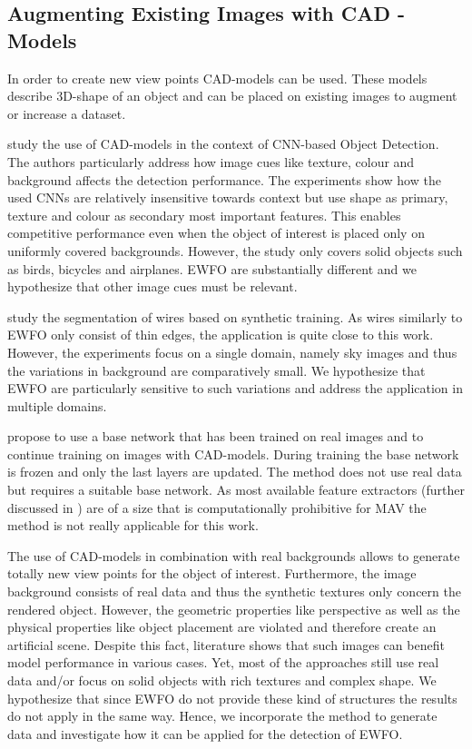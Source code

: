 \subsection{Augmenting Existing Images with CAD - Models}

In order to create new view points \ac{CAD}-models can be used. These models describe 3D-shape of an object and can be placed on existing images to augment or increase a dataset.

\citeauthor{Peng}\cite{Peng} study the use of \ac{CAD}-models in the context of \ac{CNN}-based Object Detection. The authors particularly address how image cues like texture, colour and background affects the detection performance. The experiments show how the used \acp{CNN} are relatively insensitive towards context but use shape as primary, texture and colour as secondary most important features. This enables competitive performance even when the object of interest is placed only on uniformly covered backgrounds. However, the study only covers solid objects such as birds, bicycles and airplanes. \ac{EWFO} are substantially different and we hypothesize that other image cues must be relevant.

\citeauthor{Madaan2017}\cite{Madaan2017} study the segmentation of wires based on synthetic training. As wires similarly to \ac{EWFO} only consist of thin edges, the application is quite close to this work. However, the experiments focus on a single domain, namely sky images and thus the variations in background are comparatively small. We hypothesize that \ac{EWFO} are particularly sensitive to such variations and address the application in multiple domains.

\citeauthor{Hinterstoisser2017} \cite{Hinterstoisser2017} propose to use a base network that has been trained on real images and to continue training on images with \ac{CAD}-models. During training the base network is frozen and only the last layers are updated. The method does not use real data but requires a suitable base network. As most available feature extractors (further discussed in ) are of a size that is computationally prohibitive for \ac{MAV} the method is not really applicable for this work. 

The use of CAD-models in combination with real backgrounds allows to generate totally new view points for the object of interest. Furthermore, the image background consists of real data and thus the synthetic textures only concern the rendered object. However, the geometric properties like perspective as well as the physical properties like object placement are violated and therefore create an artificial scene. Despite this fact, literature shows that such images can benefit model performance in various cases. Yet, most of the approaches still use real data and/or focus on solid objects with rich textures and complex shape. We hypothesize that since \ac{EWFO} do not provide these kind of structures the results do not apply in the same way. Hence, we incorporate the method to generate data and investigate how it can be applied for the detection of \ac{EWFO}.

